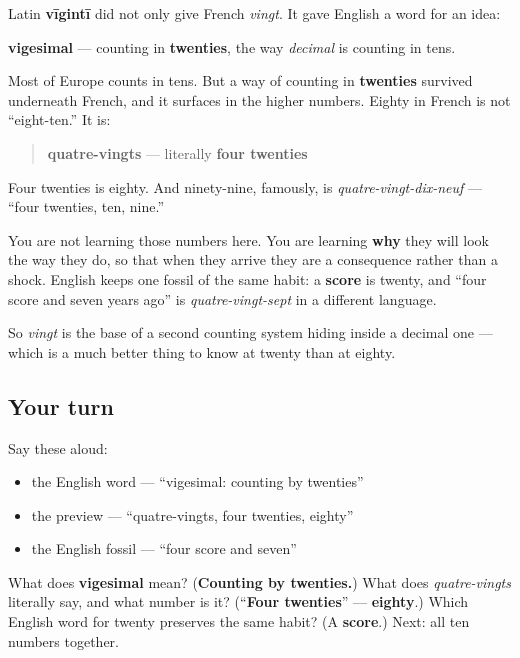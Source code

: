\begin{cousinweb}
Latin \textbf{vīgintī} did not only give French \emph{vingt}. It gave English a word for an idea:

\textbf{vigesimal} — counting in \textbf{twenties}, the way \emph{decimal} is counting in tens.

Most of Europe counts in tens. But a way of counting in \textbf{twenties} survived underneath French, and it surfaces in the higher numbers. Eighty in French is not \textquotedblleft{}eight-ten.\textquotedblright{} It is:

\begin{quote}
\textbf{quatre-vingts} — literally \textbf{four twenties}
\end{quote}

Four twenties is eighty. And ninety-nine, famously, is \emph{quatre-vingt-dix-neuf} — \textquotedblleft{}four twenties, ten, nine.\textquotedblright{}

You are not learning those numbers here. You are learning \textbf{why} they will look the way they do, so that when they arrive they are a consequence rather than a shock. English keeps one fossil of the same habit: a \textbf{score} is twenty, and \textquotedblleft{}four score and seven years ago\textquotedblright{} is \emph{quatre-vingt-sept} in a different language.

So \emph{vingt} is the base of a second counting system hiding inside a decimal one — which is a much better thing to know at twenty than at eighty.
\end{cousinweb}

\subsection*{Your turn}
Say these aloud:

\begin{itemize}
\raggedright
  \item the English word — \textquotedblleft{}vigesimal: counting by twenties\textquotedblright{}
  \item the preview — \textquotedblleft{}quatre-vingts, four twenties, eighty\textquotedblright{}
  \item the English fossil — \textquotedblleft{}four score and seven\textquotedblright{}
\end{itemize}

\begin{tcolorbox}[breakable,colback=teal!4,colframe=teal!35!black,title={Before you move on}]
What does \textbf{vigesimal} mean? (\textbf{Counting by twenties.}) What does \emph{quatre-vingts} literally say, and what number is it? (\textquotedblleft{}\textbf{Four twenties}\textquotedblright{} — \textbf{eighty}.) Which English word for twenty preserves the same habit? (A \textbf{score}.) Next: all ten numbers together.
\end{tcolorbox}
